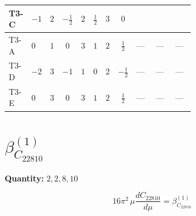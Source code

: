 \documentclass[8pt]{article}
\begin{document}
\begin{landscape}
\begin{longtable}{@{}llcccccc >{\raggedright\arraybackslash}p{0.21\linewidth} >{\raggedright\arraybackslash}p{0.21\linewidth} >{\raggedright\arraybackslash}p{0.21\linewidth}@{}}
T3-C & $-1$ & $2$ & $-\frac{1}{2}$ & $2$ & $\frac{1}{2}$ & $3$ & $0$ & \scriptsize\adjustbox{max width=\linewidth}{$\begin{gathered} \frac{i lambda12Inv2 \overline{y_{1}} \overline{y_{2}}}{3 MF}\end{gathered}$} & \scriptsize\adjustbox{max width=\linewidth}{$\begin{gathered} \frac{\sqrt{3} i g_{2}^{2} \overline{y_{1}} \overline{y_{2}}}{4 MF}\end{gathered}$} & \scriptsize\adjustbox{max width=\linewidth}{$\begin{gathered} - \frac{\sqrt{3} i ye \overline{y_{1}} \overline{y_{2}} \overline{ye}}{12 MF}\end{gathered}$} \\
\midrule
T3-A & $0$ & $1$ & $0$ & $3$ & $1$ & $2$ & $\frac{1}{2}$ & --- & --- & --- \\
\midrule
T3-D & $-2$ & $3$ & $-1$ & $1$ & $0$ & $2$ & $-\frac{1}{2}$ & --- & --- & --- \\
\midrule
T3-E & $0$ & $3$ & $0$ & $3$ & $1$ & $2$ & $\frac{1}{2}$ & --- & --- & --- \\
\midrule
\bottomrule
\end{longtable}
\clearpage
\section*{$\beta_{C_{22810}}^{(1)}$}
\noindent\textbf{Quantity: }$\mathrm{2,2,8,10}$\par\smallskip
\[16\pi^2\,\mu\frac{d C_{22810}}{d\mu}=\beta_{C_{22810}}^{(1)}\]

\end{landscape}
\end{document}
